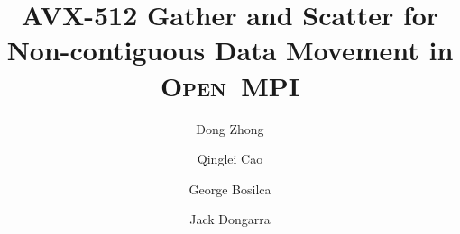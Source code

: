 \documentclass[conference]{IEEEtran}
\begin{document}
\newcommand{\mpifunc}[1]{\lstinline"MPI_#1"\xspace}
\newcommand{\prrte}[0]{\textsc{PRRTE}\xspace}
\newcommand{\pmix}[0]{\textsc{PMIx}\xspace}
\newcommand{\orte}[0]{\textsc{Open~RTE}\xspace}
\newcommand{\ompi}[0]{\textsc{Open~MPI}\xspace}
\newcommand{\mpi}[0]{\textsc{MPI}\xspace}
\newcommand{\arm}[0]{Arm\xspace}
\newcommand{\oshmem}[0]{\textsc{OpenSHMEM}\xspace}
\newcommand{\sve}[0]{\textsc{SVE}\xspace}
\newcommand{\armie}[0]{\textsc{ArmIE}\xspace}
\newcommand{\acle}[0]{\textsc{ACLE}\xspace}
\newcommand{\ourwork}[0]{\textsc{Optimized \ompi}\xspace}

\newcommand{\imb}[0]{\textsc{IMB}\xspace}

\title{AVX-512 Gather and Scatter for Non-contiguous Data Movement in \ompi
}

\makeatletter
\newcommand{\linebreakand}{%
  \end{@IEEEauthorhalign}
  \hfill\mbox{}\par
  \mbox{}\hfill\begin{@IEEEauthorhalign}
}
\makeatother

\author[1,2]{Dong Zhong}
\author[1,2]{Qinglei Cao}
\author[1,2]{George Bosilca}
\author[1,2]{Jack Dongarra}

\IEEEoverridecommandlockouts
{}

\maketitle
\end{document}
